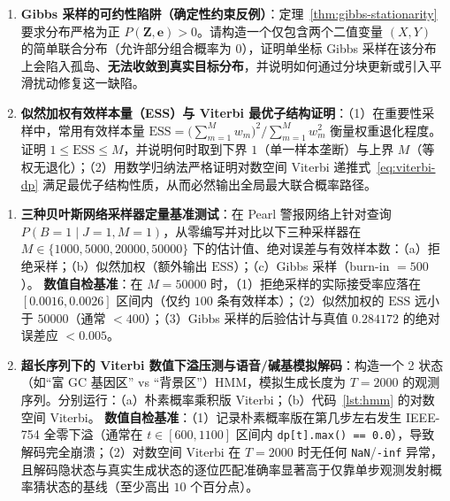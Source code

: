 
\begin{enumerate}[label=\textbf{5.\arabic*}, resume]
  \item \textbf{Gibbs 采样的可约性陷阱（确定性约束反例）}：定理~\ref{thm:gibbs-stationarity} 要求分布严格为正 $P(\mathbf{Z}, \mathbf{e}) > 0$。请构造一个仅包含两个二值变量 $(X, Y)$ 的简单联合分布（允许部分组合概率为 $0$），证明单坐标 Gibbs 采样在该分布上会陷入孤岛、\textbf{无法收敛到真实目标分布}，并说明如何通过分块更新或引入平滑扰动修复这一缺陷。

  \item \textbf{似然加权有效样本量（ESS）与 Viterbi 最优子结构证明}：（1）在重要性采样中，常用有效样本量 $\mathrm{ESS} = \big(\sum_{m=1}^M w_m\big)^2 / \sum_{m=1}^M w_m^2$ 衡量权重退化程度。证明 $1 \le \mathrm{ESS} \le M$，并说明何时取到下界 $1$（单一样本垄断）与上界 $M$（等权无退化）；（2）用数学归纳法严格证明对数空间 Viterbi 递推式~\eqref{eq:viterbi-dp} 满足最优子结构性质，从而必然输出全局最大联合概率路径。
\end{enumerate}


\begin{enumerate}[label=\textbf{5.\arabic*}, resume]
  \item \textbf{三种贝叶斯网络采样器定量基准测试}：在 Pearl 警报网络上针对查询 $P(B=1 \mid J=1, M=1)$，从零编写并对比以下三种采样器在 $M \in \{1000, 5000, 20000, 50000\}$ 下的估计值、绝对误差与有效样本数：（a）拒绝采样；（b）似然加权（额外输出 $\mathrm{ESS}$）；（c）Gibbs 采样（burn-in $= 500$）。
  \textbf{数值自检基准}：在 $M = 50000$ 时，（1）拒绝采样的实际接受率应落在 $[0.0016, 0.0026]$ 区间内（仅约 $100$ 条有效样本）；（2）似然加权的 $\mathrm{ESS}$ 远小于 $50000$（通常 $< 400$）；（3）Gibbs 采样的后验估计与真值 $0.284172$ 的绝对误差应 $< 0.005$。

  \item \textbf{超长序列下的 Viterbi 数值下溢压测与语音/碱基模拟解码}：构造一个 2 状态（如“富 GC 基因区” vs “背景区”）HMM，模拟生成长度为 $T = 2000$ 的观测序列。分别运行：（a）朴素概率乘积版 Viterbi；（b）代码~\ref{lst:hmm} 的对数空间 Viterbi。
  \textbf{数值自检基准}：（1）记录朴素概率版在第几步左右发生 IEEE-754 全零下溢（通常在 $t \in [600, 1100]$ 区间内 \texttt{dp[t].max() == 0.0}），导致解码完全崩溃；（2）对数空间 Viterbi 在 $T = 2000$ 时无任何 \texttt{NaN}/\texttt{-inf} 异常，且解码隐状态与真实生成状态的逐位匹配准确率显著高于仅靠单步观测发射概率猜状态的基线（至少高出 $10$ 个百分点）。
\end{enumerate}
